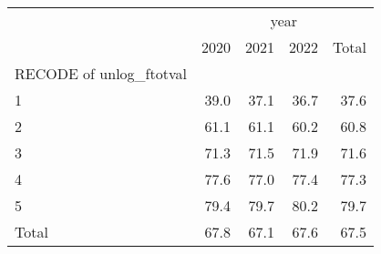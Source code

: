 \begin{tabular}{lllll}
\cline{1-5}
\multicolumn{1}{c}{} &
  \multicolumn{4}{|c}{year} \\
\multicolumn{1}{c}{} &
  \multicolumn{1}{|r}{2020} &
  \multicolumn{1}{r}{2021} &
  \multicolumn{1}{r}{2022} &
  \multicolumn{1}{r}{Total} \\
\cline{1-5}
\multicolumn{1}{l}{RECODE of unlog\_ftotval} &
  \multicolumn{1}{|r}{} &
  \multicolumn{1}{r}{} &
  \multicolumn{1}{r}{} &
  \multicolumn{1}{r}{} \\
\multicolumn{1}{l}{\hspace{1em}1} &
  \multicolumn{1}{|r}{39.0} &
  \multicolumn{1}{r}{37.1} &
  \multicolumn{1}{r}{36.7} &
  \multicolumn{1}{r}{37.6} \\
\multicolumn{1}{l}{\hspace{1em}2} &
  \multicolumn{1}{|r}{61.1} &
  \multicolumn{1}{r}{61.1} &
  \multicolumn{1}{r}{60.2} &
  \multicolumn{1}{r}{60.8} \\
\multicolumn{1}{l}{\hspace{1em}3} &
  \multicolumn{1}{|r}{71.3} &
  \multicolumn{1}{r}{71.5} &
  \multicolumn{1}{r}{71.9} &
  \multicolumn{1}{r}{71.6} \\
\multicolumn{1}{l}{\hspace{1em}4} &
  \multicolumn{1}{|r}{77.6} &
  \multicolumn{1}{r}{77.0} &
  \multicolumn{1}{r}{77.4} &
  \multicolumn{1}{r}{77.3} \\
\multicolumn{1}{l}{\hspace{1em}5} &
  \multicolumn{1}{|r}{79.4} &
  \multicolumn{1}{r}{79.7} &
  \multicolumn{1}{r}{80.2} &
  \multicolumn{1}{r}{79.7} \\
\multicolumn{1}{l}{\hspace{1em}Total} &
  \multicolumn{1}{|r}{67.8} &
  \multicolumn{1}{r}{67.1} &
  \multicolumn{1}{r}{67.6} &
  \multicolumn{1}{r}{67.5} \\
\cline{1-5}
\end{tabular}
